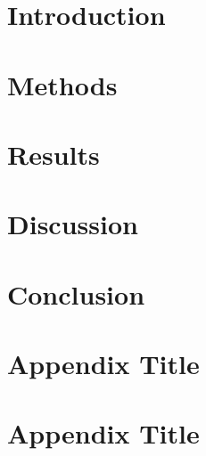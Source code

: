 \documentclass[12pt,letterpaper]{report}
\begin{document}
\renewcommand{\contentsname}{Table of Contents}
\tableofcontents
\listoffigures
\listoftables

\clearpage
{}

\chapter{Introduction}


\chapter{Methods}


\chapter{Results}


\chapter{Discussion}


\chapter{Conclusion}


\begin{appendices}

\chapter{Appendix Title}


\chapter{Appendix Title}


\end{appendices}

\renewcommand\bibname{References}
\printbibliography[heading=bibintoc]
\end{document}
